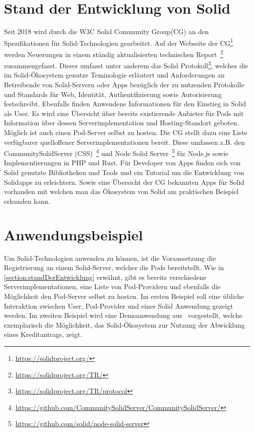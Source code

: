 \documentclass[acmtog]{acmart}
\begin{document}
\section{Stand der Entwicklung von Solid}
Seit 2018 wird durch die W3C Solid Community Group(CG) an den Spezifikationen für Solid-Technologien gearbeitet. 
Auf der Webseite der CG\footnote{\url{https://solidproject.org/}} werden Neuerungen in einem ständig aktualisierten technischen Report~\footnote{\url{https://solidproject.org/TR/}} zusammengefasst. Dieser umfasst unter anderem das Solid Protokoll\footnote{\url{https://solidproject.org/TR/protocol}}, welches die im Solid-Ökosystem genutze Teminologie erläutert und Anforderungen an Betreibende von Solid-Servern oder Apps bezüglich der zu nutzenden Protokolle und Standards für Web, Identität, Authentifizierung sowie Autorisierung festschreibt.
Ebenfalls finden Anwendene Informationen für den Einstieg in Solid als User. Es wird eine Übersicht über bereits existierende Anbieter für Pods mit Information über dessen Serverimplementation und Hosting-Standort geboten. Möglich ist auch einen Pod-Server selbst zu hosten. Die CG stellt dazu eine Liste verfügbarer quelloffener Serverimplementationen bereit. Diese umfassen z.B. den CommunitySolidServer (CSS)~\footnote{\url{https://github.com/CommunitySolidServer/CommunitySolidServer/}} und Node Solid Server~\footnote{\url{https://github.com/solid/node-solid-server}} für Node.js sowie Implementierungen in PHP und Rust.
Für Developer von Apps finden sich von Solid genutzte Bibliotheken und Tools und ein Tutorial um die Entwicklung von Solidapps zu erleichtern.
Sowie eine Übersicht der CG bekannten Apps für Solid vorhanden mit welchen man das Ökosystem von Solid am praktischen Beispiel erkunden kann.

\label{section:anwendungsbeispiel}
\section{Anwendungsbeispiel}
Um Solid-Technologien anwenden zu können, ist die Voraussetzung die Registrierung an einem Solid-Server, welcher die Pods bereitstellt. Wie in \ref{section:standDerEntwicklung} erwähnt, gibt es bereits verschiedene Serverimplementationen, eine Liste von Pod-Providern und ebenfalls die Möglichkeit den Pod-Server selbst zu hosten. Im ersten Beispiel soll eine übliche Interaktion zwischen User, Pod-Provider und einer Solid Anwendung gezeigt werden. Im zweiten Beispiel wird eine Demoanwendung aus~\cite{DBLP:conf/i-semantics/HenselmannKSS0H22} vorgestellt, welche exemplarisch die Möglichkeit, das Solid-Ökosystem zur Nutzung der Abwicklung eines Kreditantrags, zeigt. 
\end{document}
